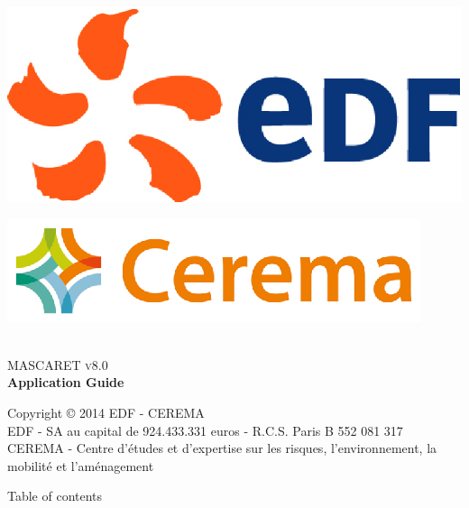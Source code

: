 \documentclass[a4paper,12pt]{article}
\begin{document}
\begin{titlepage}

\begin{center}

\begin{minipage}{0.4\textwidth}
\begin{flushleft} \large
\includegraphics[scale=0.4]{./EDF_Logo}
\end{flushleft}
\end{minipage}
\begin{minipage}{0.4\textwidth}
\begin{flushright} \large
\includegraphics[scale=1.]{./CEREMA_Logo}
\end{flushright}
\end{minipage}
\textsc{ }\\[7cm]
\textsc{\Huge MASCARET v8.0}\\[1cm]
{ \huge \bfseries Application Guide}

\vfill

{\Large Copyright {\copyright} 2014 EDF - CEREMA}\\[0.5cm]
{EDF - SA au capital de 924.433.331 euros - R.C.S. Paris B 552 081 317}\\
{CEREMA - Centre d'\'etudes et d'expertise sur les risques, l'environnement, la mobilit\'e et l'am\'enagement}

\end{center}

\end{titlepage}

\newpage

%
 Table of contents 
\end{document}
